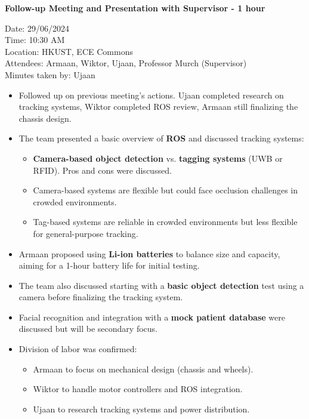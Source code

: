\documentclass{article}
\begin{document}
\vspace{0.5cm}

\textbf{Follow-up Meeting and Presentation with Supervisor - 1 hour}

Date: 29/06/2024 \\
Time: 10:30 AM \\
Location: HKUST, ECE Commons \\
Attendees: Armaan, Wiktor, Ujaan, Professor Murch (Supervisor) \\
Minutes taken by: Ujaan

\begin{itemize}
    \item Followed up on previous meeting's actions. Ujaan completed research on tracking systems, Wiktor completed ROS review, Armaan still finalizing the chassis design.
    \item The team presented a basic overview of \textbf{ROS} and discussed tracking systems:
        \begin{itemize}
            \item \textbf{Camera-based object detection} vs. \textbf{tagging systems} (UWB or RFID). Pros and cons were discussed.
            \item Camera-based systems are flexible but could face occlusion challenges in crowded environments.
            \item Tag-based systems are reliable in crowded environments but less flexible for general-purpose tracking.
        \end{itemize}
    \item Armaan proposed using \textbf{Li-ion batteries} to balance size and capacity, aiming for a 1-hour battery life for initial testing.
    \item The team also discussed starting with a \textbf{basic object detection} test using a camera before finalizing the tracking system.
    \item Facial recognition and integration with a \textbf{mock patient database} were discussed but will be secondary focus.
    \item Division of labor was confirmed: 
        \begin{itemize}
            \item Armaan to focus on mechanical design (chassis and wheels).
            \item Wiktor to handle motor controllers and ROS integration.
            \item Ujaan to research tracking systems and power distribution.
        \end{itemize}
\end{itemize}
\end{document}
